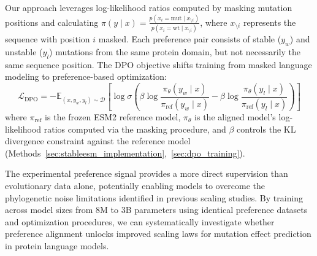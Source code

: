 \documentclass[]{fairmeta}
\begin{document}
\begin{tcolorbox}[
  title=StableESM: Direct Preference Optimization Loss,
  colback=white,
  colframe=black!50,
  coltitle=black,
  colbacktitle=black!10,
  fonttitle=\bfseries
]
Our approach leverages log-likelihood ratios computed by masking mutation positions and calculating $\pi(y \mid x) = \frac{p(x_i = \text{mut} \mid x_{\setminus i})}{p(x_i = \text{wt} \mid x_{\setminus i})}$, where $x_{\setminus i}$ represents the sequence with position $i$ masked. Each preference pair consists of stable ($y_w$) and unstable ($y_l$) mutations from the same protein domain, but not necessarily the same sequence position. The DPO objective shifts training from masked language modeling to preference-based optimization:
\begin{equation}
\mathcal{L}_{\text{DPO}} = -\mathbb{E}_{(x, y_w, y_l) \sim \mathcal{D}} \left[ \log \sigma \left( \beta \log \frac{\pi_\theta(y_w \mid x)}{\pi_{\text{ref}}(y_w \mid x)} - \beta \log \frac{\pi_\theta(y_l \mid x)}{\pi_{\text{ref}}(y_l \mid x)} \right) \right]
\end{equation}
where $\pi_{\text{ref}}$ is the frozen ESM2 reference model, $\pi_\theta$ is the aligned model's log-likelihood ratios computed via the masking procedure, and $\beta$ controls the KL divergence constraint against the reference model (Methods~\ref{sec:stableesm_implementation},~\ref{sec:dpo_training}).
\end{tcolorbox}

The experimental preference signal provides a more direct supervision than evolutionary data alone, potentially enabling models to overcome the phylogenetic noise limitations identified in previous scaling studies. By training across model sizes from 8M to 3B parameters using identical preference datasets and optimization procedures, we can systematically investigate whether preference alignment unlocks improved scaling laws for mutation effect prediction in protein language models.
\end{document}
